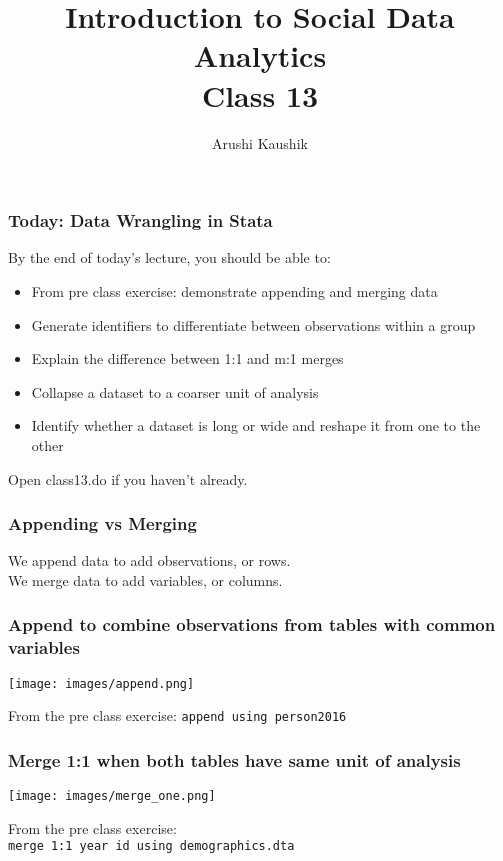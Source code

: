 \documentclass[11pt]{beamer}
\title[Class 13]{Introduction to Social Data Analytics \\
	\bigskip Class 13}
\author[Kaushik]{Arushi Kaushik}
\institute[UCSD]{arkaushi@ucsd.edu}
\begin{document}
\frame{\titlepage}


\begin{frame}
\frametitle{Today: Data Wrangling in Stata}
By the end of today's lecture, you should be able to: \medskip
\begin{itemize} \itemsep1em
	\item From pre class exercise: demonstrate appending and merging data
	\item Generate identifiers to differentiate between observations within a group 
	\item Explain the difference between 1:1 and m:1 merges
	\item Collapse a dataset to a coarser unit of analysis
	\item Identify whether a dataset is long or wide and reshape it from one to the other
\end{itemize} \bigskip
Open class13.do if you haven't already. 
\end{frame}

\begin{frame}
\frametitle{Appending vs Merging}
We \alert{append} data to add observations, or rows. \\ \bigskip
We \alert{merge} data to add variables, or columns. 
\end{frame}

\begin{frame}
\frametitle{Append to combine observations from tables with common variables}
\begin{center}
	\texttt{[image: images/append.png]}
\end{center} \pause \bigskip
From the pre class exercise: \texttt{append using person2016}
\end{frame}

\begin{frame}
\frametitle{Merge 1:1 when both tables have same unit of analysis}
\begin{center}
	\texttt{[image: images/merge\_one.png]}
\end{center} \pause \bigskip
From the pre class exercise: \\ \texttt{merge 1:1 year id using demographics.dta}
\end{frame}
\end{document}
